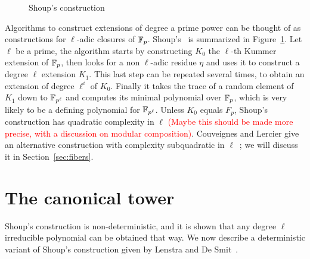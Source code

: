 \documentclass{sig-alternate}
\newcommand{\todo}[1]{\textcolor{red}{(#1)}}
\begin{document}
\begin{figure}
  \centering
  \caption{Shoup's construction}
  \label{fig:shoup}
\end{figure}

Algorithms to construct extensions of degree a prime power can be
thought of as constructions for $\ell$-adic closures of
$\mathbb{F}_p$. Shoup's~\cite{shoup94} is summarized in
Figure~\ref{fig:shoup}. Let $\ell$ be a prime, the algorithm starts by
constructing $K_0$ the $\ell$-th Kummer extension of $\mathbb{F}_p$, then
looks for a non $\ell$-adic residue $\eta$ and uses it to construct a
degree $\ell$ extension $K_1$. This last step can be repeated several
times, to obtain an extension of degree $\ell^i$ of $K_0$. Finally it
takes the trace of a random element of $K_1$ down to $\mathbb{F}_{p^\ell}$ and
computes its minimal polynomial over $\mathbb{F}_p$, which is very likely to
be a defining polynomial for $\mathbb{F}_{p^\ell}$. Unless $K_0$ equals $F_p$,
Shoup's construction has quadratic complexity in $\ell$ \todo{Maybe
  this should be made more precise, with a discussion on modular
  composition}.  Couveignes and Lercier give an alternative
construction with complexity subquadratic in
$\ell$~\cite{couveignes+lercier11}; we will discuss it in
Section~\ref{sec:fibers}.



\section{The canonical tower}
\label{sec:LDtower}

Shoup's construction is non-deterministic, and it is shown that any
degree $\ell$ irreducible polynomial can be obtained that way. We now
describe a deterministic variant of Shoup's construction given by
Lenstra and De Smit~\cite{lenstra+desmit08-stdmodels}.
\end{document}
